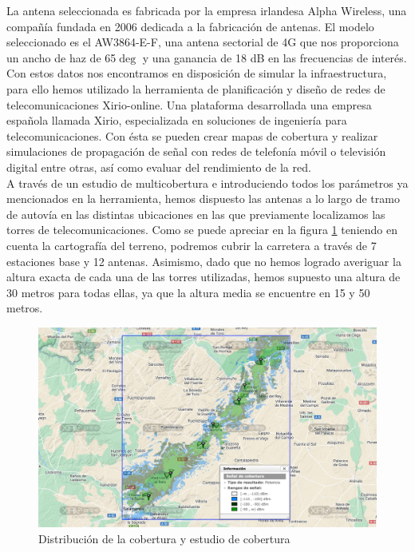 La antena seleccionada es fabricada por la empresa irlandesa Alpha Wireless, una compañía fundada en 2006 dedicada a la fabricación de antenas. El modelo seleccionado es el AW3864-E-F, una antena sectorial de 4G que nos proporciona un ancho de haz de 65$\deg$ y una ganancia de 18 dB en las frecuencias de interés.\\

Con estos datos nos encontramos en disposición de simular la infraestructura, para ello hemos utilizado la herramienta de planificación y diseño de redes de telecomunicaciones Xirio-online. Una plataforma desarrollada una empresa española llamada Xirio, especializada en soluciones de ingeniería para telecomunicaciones. Con ésta se pueden crear mapas de cobertura y realizar simulaciones de propagación de señal con redes de telefonía móvil o televisión digital entre otras, así como evaluar del rendimiento de la red.\\

A través de un estudio de multicobertura e introduciendo todos los parámetros ya mencionados en la herramienta, hemos dispuesto las antenas a lo largo de tramo de autovía en las distintas ubicaciones en las que previamente localizamos las torres de telecomunicaciones. Como se puede apreciar en la figura \ref{xirio} teniendo en cuenta la cartografía del terreno, podremos cubrir la carretera a través de 7 estaciones base y 12 antenas. Asimismo, dado que no hemos logrado averiguar la altura exacta de cada una de las torres utilizadas, hemos supuesto una altura de 30 metros para todas ellas, ya que la altura media se encuentre en 15 y 50 metros.

\begin{figure}[H]
\centering
\includegraphics[width=\textwidth]{Imagenes/Solucion/xirio.pdf}
\caption{Distribución de la cobertura y estudio de cobertura}
\label{xirio}
\end{figure}


